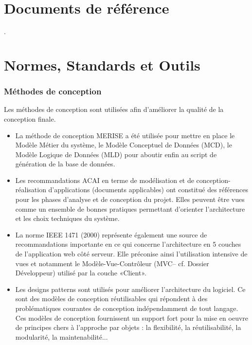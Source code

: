 \documentclass[a4paper,12pt]{report}
\begin{document}
\begin{onehalfspace}
\chapter{Documents de référence}
.

\chapter{Normes, Standards et Outils}

\subsection{Méthodes de conception}
  Les méthodes de conception sont utilisées afin d'améliorer la qualité de la conception finale.

\begin{itemize}
\item La méthode de conception MERISE a été utilisée pour mettre en place le Modèle Métier du système,  le  Modèle Conceptuel de Données (MCD), le  Modèle Logique de Données (MLD)  pour aboutir enfin au script de génération de la base de données.

\item Les recommandations ACAI en terme de modélisation et de conception-réalisation d'applications (documents applicables) ont constitué des références pour les phases d’analyse et de conception du projet. Elles peuvent être vues comme un ensemble de bonnes pratiques permettant d’orienter l’architecture et les choix techniques du système.


\item La  norme IEEE 1471 (2000) représente également une source de recommandations importante en ce qui concerne l’architecture en 5 couches de l’application web côté serveur. Elle préconise ainsi l’utilisation intensive de vues et notamment le Modèle-Vue-Contrôleur (MVC– cf. Dossier Développeur) utilisé par la couche «Client».

\item Les designs patterns sont utilisés pour améliorer l’architecture du logiciel. Ce sont des modèles de conception réutilisables qui répondent à des problématiques courantes de conception indépendamment de tout langage. Ces modèles de conception fournissent un support fort pour la mise en oeuvre de principes chers à l'approche par  objets : la flexibilité, la réutilisabilité, la modularité, la maintenabilité...\\
\end{itemize}


\end{onehalfspace}
\end{document}

